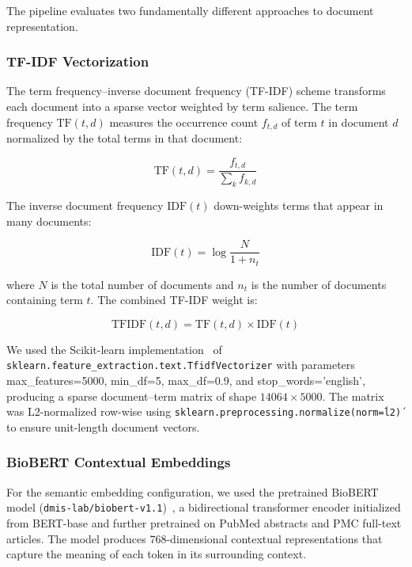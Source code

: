 \documentclass[a4paper,fleqn]{cas-dc}
\begin{document}
The pipeline evaluates two fundamentally different approaches to document representation.

\subsubsection{TF-IDF Vectorization}

The term frequency--inverse document frequency (TF-IDF) scheme transforms each document into a sparse vector weighted by term salience. The term frequency $\text{TF}(t,d)$ measures the occurrence count $f_{t,d}$ of term $t$ in document $d$ normalized by the total terms in that document:

\begin{equation}
\text{TF}(t,d) = \frac{f_{t,d}}{\sum_{k} f_{k,d}}
\end{equation}

The inverse document frequency $\text{IDF}(t)$ down-weights terms that appear in many documents:

\begin{equation}
\text{IDF}(t) = \log \frac{N}{1 + n_t}
\end{equation}

where $N$ is the total number of documents and $n_t$ is the number of documents containing term $t$. The combined TF-IDF weight is:

\begin{equation}
\text{TFIDF}(t,d) = \text{TF}(t,d) \times \text{IDF}(t)
\end{equation}

We used the Scikit-learn implementation~\cite{ref23} of \texttt{sklearn.\allowbreak feature\_extraction.\allowbreak text.\allowbreak TfidfVectorizer} with parameters max\_features=5000, min\_df=5, max\_df=0.9, and stop\_words='english', producing a sparse document--term matrix of shape $14064 \times 5000$. The matrix was L2-normalized row-wise using \texttt{sklearn.\allowbreak preprocessing.\allowbreak normalize(norm=\'l2\')} to ensure unit-length document vectors.

\subsubsection{BioBERT Contextual Embeddings}

For the semantic embedding configuration, we used the pretrained BioBERT model (\texttt{dmis-lab/\allowbreak biobert-v1.1})~\cite{ref1}, a bidirectional transformer encoder initialized from BERT-base and further pretrained on PubMed abstracts and PMC full-text articles. The model produces 768-dimensional contextual representations that capture the meaning of each token in its surrounding context.
\end{document}
